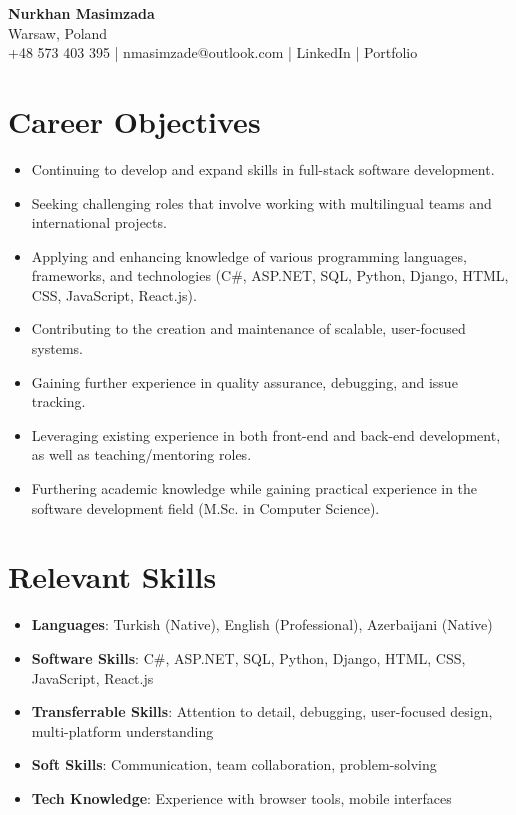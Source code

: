 \documentclass[11pt,a4paper]{article}
\begin{document}
\begin{center}
    {\Large \textbf{Nurkhan Masimzada}} \\
    Warsaw, Poland \\
    +48 573 403 395 | nmasimzade@outlook.com | LinkedIn | Portfolio
\end{center}

\section*{Career Objectives}
\begin{itemize}[leftmargin=*]
    \item Continuing to develop and expand skills in full-stack software development.
    \item Seeking challenging roles that involve working with multilingual teams and international projects.
    \item Applying and enhancing knowledge of various programming languages, frameworks, and technologies (C\#, ASP.NET, SQL, Python, Django, HTML, CSS, JavaScript, React.js).
    \item Contributing to the creation and maintenance of scalable, user-focused systems.
    \item Gaining further experience in quality assurance, debugging, and issue tracking.
    \item Leveraging existing experience in both front-end and back-end development, as well as teaching/mentoring roles.
    \item Furthering academic knowledge while gaining practical experience in the software development field (M.Sc. in Computer Science).
\end{itemize}

\section*{Relevant Skills}
\begin{itemize}[leftmargin=*]
    \item \textbf{Languages}: Turkish (Native), English (Professional), Azerbaijani (Native)
    \item \textbf{Software Skills}: C\#, ASP.NET, SQL, Python, Django, HTML, CSS, JavaScript, React.js
    \item \textbf{Transferrable Skills}: Attention to detail, debugging, user-focused design, multi-platform understanding
    \item \textbf{Soft Skills}: Communication, team collaboration, problem-solving
    \item \textbf{Tech Knowledge}: Experience with browser tools, mobile interfaces
\end{itemize}
\end{document}

